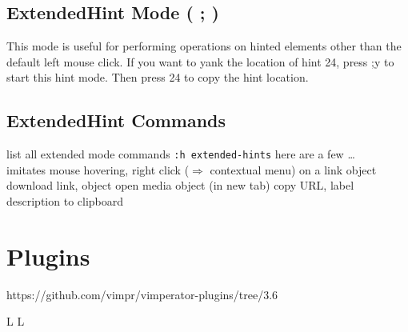\subsection{ExtendedHint Mode ( ; )}{This mode is useful for
performing operations on hinted elements other than the default
left mouse click. If you want to yank the location of hint 24, press ;y to start this hint
mode. Then press 24 to copy the hint location.}
\subsection{ExtendedHint Commands}{list all extended mode commands {\tt :h extended-hints}}
here are a few \ldots\\
	{imitates mouse hovering, right click ($\Rightarrow$ contextual menu) on a link object}
	{download link, object}
	{open media object (in new tab)}
	{copy URL, label description to clipboard}

\section{Plugins}{https://github.com/vimpr/vimperator-plugins/tree/3.6}
\copyrightnotice
%


\vfil
\supereject
\if L\lr \else\null\vfill\eject\fi
\if L\lr \else\null\vfill\eject\fi
\bye

